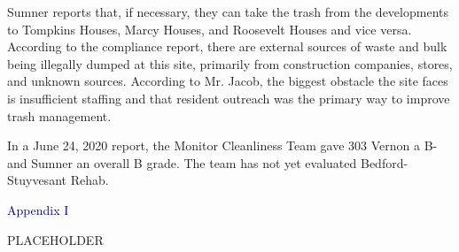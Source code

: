 Sumner reports that, if necessary, they can take the trash from the developments to Tompkins Houses, Marcy Houses, and Roosevelt Houses and vice versa. According to the compliance report, there are external sources of waste and bulk being illegally dumped at this site, primarily from construction companies, stores, and unknown sources. According to Mr. Jacob, the biggest obstacle the site faces is insufficient staffing and that resident outreach was the primary way to improve trash management.  

In a June 24, 2020 report, the Monitor Cleanliness Team gave 303 Vernon a B- and Sumner an overall B grade. The team has not yet evaluated Bedford-Stuyvesant Rehab.  

\pagebreak
\pagestyle{plain}
\pagecolor{lightBlue}
\pagebreak
{}
\pagestyle{fancy}
\fancyhf{}
\renewcommand{\chaptermark}[1]{\markboth{#1}{}}
\fancyfoot[LE,RO]{\thepage}
\textcolor{darkBlue}{Appendix I}

PLACEHOLDER

\pagebreak


